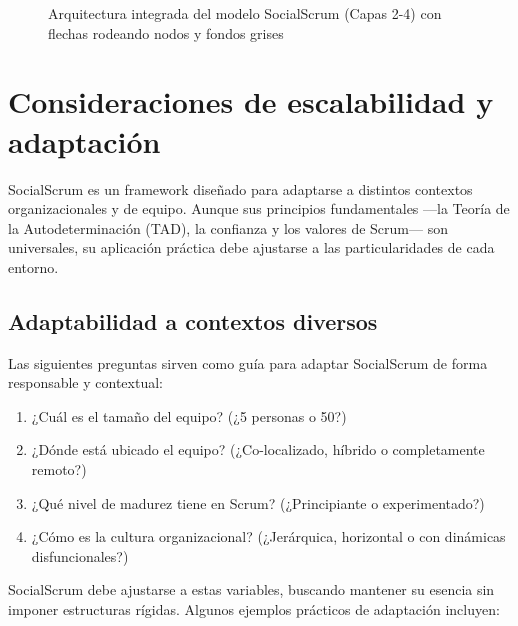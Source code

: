 \begin{figure}[p]
    \caption{\centering Arquitectura integrada del modelo SocialScrum (Capas 2-4) con flechas rodeando nodos y fondos grises}
    \label{fig:arquitectura_integrada_final}
\end{figure}

\FloatBarrier

\section{Consideraciones de escalabilidad y adaptación}

SocialScrum es un framework diseñado para adaptarse a distintos contextos organizacionales y de equipo.
Aunque sus principios fundamentales —la Teoría de la Autodeterminación (TAD), la confianza y los valores de Scrum— son universales, su aplicación práctica debe ajustarse a las particularidades de cada entorno.

\subsection{Adaptabilidad a contextos diversos}

Las siguientes preguntas sirven como guía para adaptar SocialScrum de forma responsable y contextual:

\begin{enumerate}
    \item ¿Cuál es el tamaño del equipo? (¿5 personas o 50?)
    \item ¿Dónde está ubicado el equipo? (¿Co-localizado, híbrido o completamente remoto?)
    \item ¿Qué nivel de madurez tiene en Scrum? (¿Principiante o experimentado?)
    \item ¿Cómo es la cultura organizacional? (¿Jerárquica, horizontal o con dinámicas disfuncionales?)
\end{enumerate}

SocialScrum debe ajustarse a estas variables, buscando mantener su esencia sin imponer estructuras rígidas. Algunos ejemplos prácticos de adaptación incluyen:


